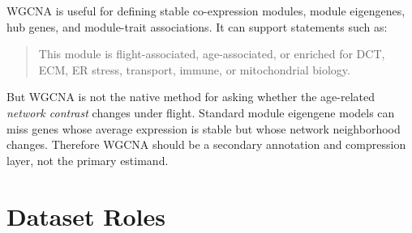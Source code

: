 \documentclass[11pt]{article}
\begin{document}
WGCNA is useful for defining stable co-expression modules, module eigengenes, hub
genes, and module-trait associations. It can support statements such as:

\begin{quote}
This module is flight-associated, age-associated, or enriched for DCT, ECM, ER
stress, transport, immune, or mitochondrial biology.
\end{quote}

But WGCNA is not the native method for asking whether the age-related
\emph{network contrast} changes under flight. Standard module eigengene models can
miss genes whose average expression is stable but whose network neighborhood
changes. Therefore WGCNA should be a secondary annotation and compression layer,
not the primary estimand.

\section{Dataset Roles}
\end{document}
